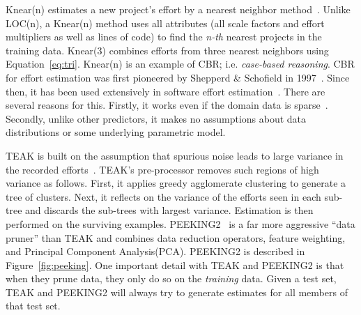 \documentclass[smallcondesed]{svjour3}
\newcommand{\fig}[1]{Figure~\ref{fig:#1}}
\newenvironment{BLUE}{\color{blue}}{\ignorespacesafterend}
\begin{document}
Knear(n) estimates a new project's effort
by a nearest neighbor  method~\cite{shepperd97}. Unlike LOC(n),
a Knear(n) method uses all attributes
(all scale factors and effort multipliers as well as lines of code)
to find the {\em n-th} nearest projects in the training data. 
Knear(3) combines efforts from three nearest neighbors using
Equation~\ref{eq:tri}.
Knear(n) is an example of CBR; i.e.  {\em case-based reasoning}.
CBR for effort estimation was 
first pioneered by Shepperd \& Schofield
in 1997~\cite{shepperd97}.
  Since then, it 
has been used extensively in software effort
estimation~\cite{Auer2006,Walkerden1999,%
  Kirsopp2002,shepperd97,kadoda00,Li2008,Li2006,Li2007,Li2009a,
  keung2008a,keung2008b,keung2008c}.  
There are several reasons  for this. Firstly, 
it works even if the domain data is sparse~\cite{Myrtveit}.
Secondly, 
unlike other predictors, it makes no assumptions about data
distributions or some  underlying parametric model. 

TEAK is built
on the assumption that spurious noise leads to large variance in the recorded efforts~\cite{koc11b}.
TEAK's pre-processor removes such regions of high variance as follows.
First, it  applies greedy agglomerate clustering  to generate a tree of clusters.
Next, it reflects on the variance
of the efforts seen in each sub-tree and discards the sub-trees with largest variance. Estimation is then performed
on the surviving examples.
PEEKING2~\cite{papa13} is a far more aggressive ``data pruner'' than TEAK and combines   data reduction operators, 
feature weighting, and Principal Component Analysis(PCA). PEEKING2 is described in  \fig{peeking}.
\begin{BLUE}
  One important detail with TEAK and PEEKING2 is that when they prune data, they
  only do so on the {\em training} data. Given a test set, TEAK and PEEKING2 will always try to
  generate estimates for all members of that test set.
  \end{BLUE}
  
\end{document}
